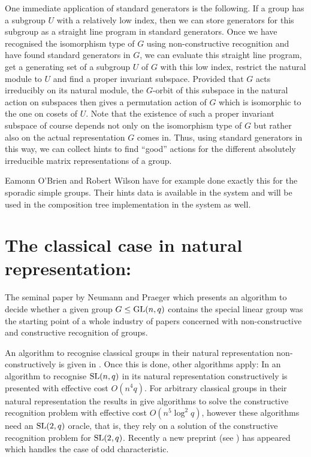 \begin{App}
\label{hintsstabchains}
One immediate application of standard generators is the following. If
a group has a subgroup $U$ with a relatively low index, then we can store
generators for this subgroup as a straight line program in standard
generators. Once we have recognised the isomorphism type of $G$
using non-constructive recognition and have found standard generators
in $G$, we can evaluate this straight line program, get a
generating set of a subgroup $U$ of $G$ with this low index, restrict
the natural module to $U$ and find a proper invariant subspace. Provided
that $G$ acts irreducibly on its natural module, the
$G$-orbit of this subspace in the natural action on subspaces then
gives a permutation action of $G$ which is isomorphic to the one on
cosets of $U$. Note that the existence of such a proper invariant subspace 
of course depends not only on the isomorphism type of $G$ but rather
also on the actual representation $G$ comes in.
Thus, using standard generators in this way, we can collect hints
to find ``good'' actions for the different absolutely irreducible
matrix representations of a group.

Eamonn O'Brien and Robert Wilson have for example done exactly this
for the sporadic simple groups. Their hints data is available in the
{\MAGMA} system and will be used in the composition tree
implementation in the {\GAP} system as well.
\end{App}

\section{The classical case in natural representation: }
\label{solveD8}

The seminal paper by Neumann and Praeger \cite{neumann-praeger} which
presents an algorithm to decide whether a given group $G \le \GL(n,q)$
contains the special linear group was the starting point of a whole
industry of papers concerned with non-constructive and constructive
recognition of groups.

An algorithm to recognise classical groups in their
natural representation non-constructively is given in
\cite{classicalnonconstructive}. Once this is done, other algorithms
apply: In \cite{slrecogconstr} an algorithm to recognise $\SL(n,q)$
in its natural representation constructively is presented with
effective cost $O(n^4q)$. For arbitrary classical groups in their
natural representation the results in \cite{peteconstructiveclassical}
give algorithms to solve the constructive recognition problem with
effective cost $O(n^5 \log^2 q)$, however these algorithms need an
$\SL(2,q)$ oracle, that is, they rely on a solution of the constructive
recognition problem for $\SL(2,q)$. Recently a new preprint (see
\cite{recogclassicalodd}) has appeared which handles the case of odd
characteristic.

